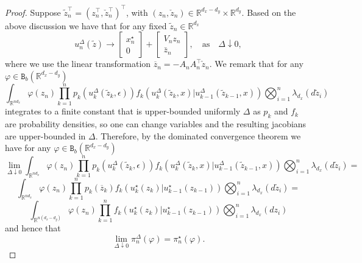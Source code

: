 \documentclass[english,13pt]{article}
\numberwithin{equation}{section}
\begin{document}
\begin{proof}
Suppose $\widetilde{z}_n^{\top} = (z_n^{\top},\check{z}_n^{\top})^{\top}$,  with $(z_n,\check{z}_n)\in \mathbb{R}^{d_x-d_y}\times \mathbb{R}^{d_y}$. Based on the above discussion  we have that for any fixed $\widetilde{z}_n\in\mathbb{R}^{d_x}$ %
\begin{equation}\label{eq:prf1}
u_n^{\Delta}(\widetilde{z}) \rightarrow
\begin{bmatrix}
x_n^{\star} \\
0
\end{bmatrix} + 
\begin{bmatrix}
V_n z_n  \\
\bar{z}_n
\end{bmatrix},\quad\text{as}\quad{\Delta\downarrow 0},
\end{equation}
where we use the linear transformation $\overline{z}_n=-A_nA_n^\top \check
{z}_n$.
We remark that for any $\varphi\in\mathtt{B}_b(\mathbb{R}^{d_x-d_y})$
$$
\int_{\mathbb{R}^{nd_x}} \varphi(z_n)  \prod_{k=1}^n p_k(u_k^{\Delta}(\widetilde{z}_k,\epsilon))
f_k(u_k^{\Delta}(\widetilde{z}_k,x)|u_{k-1}^{\Delta}(\widetilde{z}_{k-1},x)) 
\bigotimes_{i=1}^n \lambda_{d_x}(d\widetilde{z}_i)
$$
integrates to a finite constant that is upper-bounded uniformly $\Delta$ as $p_k$ and $f_k$ are probability densities,
so one can change variables and the resulting jacobians are upper-bounded in $\Delta$.
Therefore,  by the dominated convergence theorem we have for any $\varphi\in\mathtt{B}_b(\mathbb{R}^{d_x-d_y})$
$$
\lim_{\Delta\downarrow 0} \int_{\mathbb{R}^{nd_x}} \varphi(z_n)  \prod_{k=1}^n p_k(u_k^{\Delta}(\widetilde{z}_k,\epsilon))
f_k(u_k^{\Delta}(\widetilde{z}_k,x)|u_{k-1}^{\Delta}(\widetilde{z}_{k-1},x)) 
\bigotimes_{i=1}^n \lambda_{d_x}(d\widetilde{z}_i)
 = 
$$
$$
\int_{\mathbb{R}^{nd_x}} \varphi(z_n)  \prod_{k=1}^n p_k(\overline{z}_k)
f_k(u_k^{\star}(z_k)|u_{k-1}^{\star}(z_{k-1})) 
\bigotimes_{i=1}^n \lambda_{d_x}(d\widetilde{z}_i) 
 =
$$
$$ 
 \int_{\mathbb{R}^{n(d_x-d_y)}}
\varphi(z_n)  \prod_{k=1}^n 
f_k(u_k^{\star}(z_k)|u_{k-1}^{\star}(z_{k-1})) 
\bigotimes_{i=1}^n \lambda_{d_x}(dz_i)
$$
and hence that
$$
\lim_{\Delta\downarrow 0}\pi_n^{\Delta}(\varphi) = \pi_n^{\star}(\varphi).
$$


\end{proof}
\end{document}
